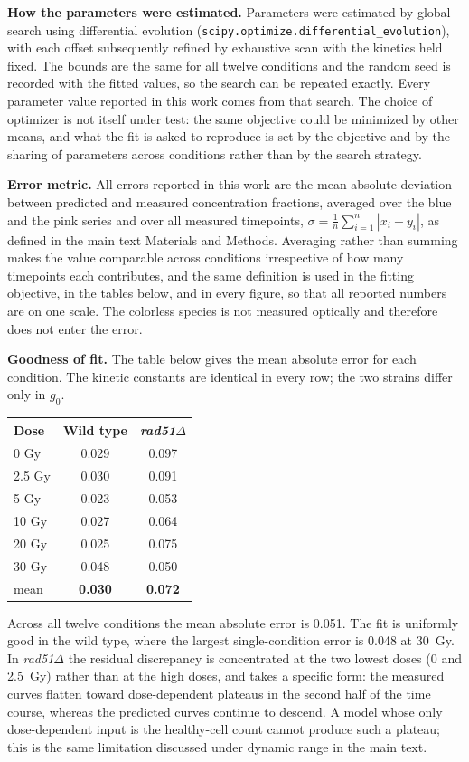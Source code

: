 \documentclass[11pt]{article}
\begin{document}
\textbf{How the parameters were estimated.} Parameters were estimated by global
search using differential evolution
(\texttt{scipy.optimize.differential\_evolution}), with each offset subsequently
refined by exhaustive scan with the kinetics held fixed. The bounds are the same
for all twelve conditions and the random seed is recorded with the fitted values,
so the search can be repeated exactly. Every parameter value reported in this work
comes from that search. The choice of optimizer is not itself under test: the same
objective could be minimized by other means, and what the fit is asked to
reproduce is set by the objective and by the sharing of parameters across
conditions rather than by the search strategy.

\textbf{Error metric.} All errors reported in this work are the mean absolute
deviation between predicted and measured concentration fractions, averaged over
the blue and the pink series and over all measured timepoints,
$\sigma = \frac{1}{n}\sum^n_{i=1}|x_i - y_i|$, as defined in the main text
Materials and Methods. Averaging rather than summing makes the
value comparable across conditions irrespective of how many timepoints each
contributes, and the same definition is used in the fitting objective, in the
tables below, and in every figure, so that all reported numbers are on one scale.
The colorless species is not measured optically and therefore does not enter the
error.

\textbf{Goodness of fit.} The table below gives the mean absolute error for each
condition. The kinetic constants are identical in every row; the two strains
differ only in $g_0$.

\begin{center}
\begin{tabular}{lcc}
\hline
Dose & Wild type & \textit{rad51}$\Delta$ \\
\hline
0 Gy    & 0.029 & 0.097 \\
2.5 Gy  & 0.030 & 0.091 \\
5 Gy    & 0.023 & 0.053 \\
10 Gy   & 0.027 & 0.064 \\
20 Gy   & 0.025 & 0.075 \\
30 Gy   & 0.048 & 0.050 \\
\hline
mean    & \textbf{0.030} & \textbf{0.072} \\
\hline
\end{tabular}
\end{center}

Across all twelve conditions the mean absolute error is 0.051. The fit is
uniformly good in the wild type, where the largest single-condition error is 0.048
at 30~Gy. In \textit{rad51}$\Delta$ the residual discrepancy is concentrated at
the two lowest doses (0 and 2.5~Gy) rather than at the high doses, and takes a
specific form: the measured curves flatten toward dose-dependent plateaus in the
second half of the time course, whereas the predicted curves continue to descend.
A model whose only dose-dependent input is the healthy-cell count cannot produce
such a plateau; this is the same limitation discussed under dynamic range in the
main text.
\end{document}
